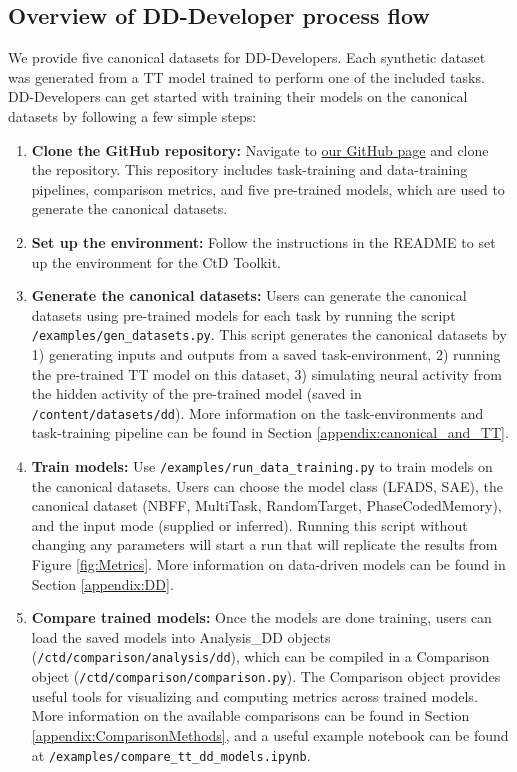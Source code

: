 \documentclass{article}
\begin{document}
\subsection{Overview of DD-Developer process flow}
We provide five canonical datasets for DD-Developers. Each synthetic dataset was generated from a TT model trained to perform one of the included tasks. DD-Developers can get started with training their models on the canonical datasets by following a few simple steps:
\begin{enumerate}
    \item \textbf{Clone the GitHub repository:} Navigate to \href{https://github.com/snel-repo/ComputationThroughDynamicsToolkit}{our GitHub page} and clone the repository. This repository includes task-training and data-training pipelines, comparison metrics, and five pre-trained models, which are used to generate the canonical datasets.

    \item \textbf{Set up the environment:} Follow the instructions in the README to set up the environment for the CtD Toolkit.

    \item \textbf{Generate the canonical datasets:} Users can generate the canonical datasets using pre-trained models for each task by running the script \texttt{/examples/gen\_datasets.py}. This script generates the canonical datasets by 1) generating inputs and outputs from a saved task-environment, 2) running the pre-trained TT model on this dataset, 3) simulating neural activity from the hidden activity of the pre-trained model (saved in \texttt{/content/datasets/dd}). More information on the task-environments and task-training pipeline can be found in Section \ref{appendix:canonical_and_TT}.

    \item \textbf{Train models:} Use \texttt{/examples/run\_data\_training.py} to train models on the canonical datasets. Users can choose the model class (LFADS, SAE), the canonical dataset (NBFF, MultiTask, RandomTarget, PhaseCodedMemory), and the input mode (supplied or inferred). Running this script without changing any parameters will start a run that will replicate the results from Figure \ref{fig:Metrics}. More information on data-driven models can be found in Section \ref{appendix:DD}.

    \item \textbf{Compare trained models:} Once the models are done training, users can load the saved models into Analysis\_DD objects (\texttt{/ctd/comparison/analysis/dd}), which can be compiled in a Comparison object (\texttt{/ctd/comparison/comparison.py}). The Comparison object provides useful tools for visualizing and computing metrics across trained models. More information on the available comparisons can be found in Section \ref{appendix:ComparisonMethods}, and a useful example notebook can be found at \texttt{/examples/compare\_tt\_dd\_models.ipynb}.
\end{enumerate}
\end{document}
